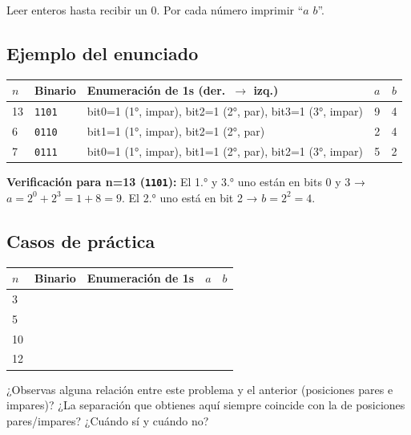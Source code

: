 \documentclass[12pt, oneside]{article}
\begin{document}
Leer enteros hasta recibir un 0.  Por cada número imprimir ``$a$ $b$''.

\subsection{Ejemplo del enunciado}

\begin{center}
\begin{tabular}{p{1.2cm}p{2cm}p{4.8cm}cc}
  \toprule
  $n$ & \textbf{Binario} & \textbf{Enumeración de 1s (der.\ $\to$ izq.)} & $a$ & $b$ \\
  \midrule
  13 & \texttt{1101}
     & bit0=1 (1°, impar), bit2=1 (2°, par), bit3=1 (3°, impar)
     & 9 & 4 \\
   6 & \texttt{0110}
     & bit1=1 (1°, impar), bit2=1 (2°, par)
     & 2 & 4 \\
   7 & \texttt{0111}
     & bit0=1 (1°, impar), bit1=1 (2°, par), bit2=1 (3°, impar)
     & 5 & 2 \\
  \bottomrule
\end{tabular}
\end{center}

\textbf{Verificación para n=13 (\texttt{1101}):}
El 1.° y 3.° uno están en bits 0 y 3 → $a = 2^0 + 2^3 = 1+8 = 9$.
El 2.° uno está en bit 2 → $b = 2^2 = 4$.

\subsection{Casos de práctica}

\begin{center}
\begin{tabular}{p{0.8cm}p{2cm}p{4.5cm}cc}
  \toprule
  $n$ & \textbf{Binario} & \textbf{Enumeración de 1s} & $a$ & $b$ \\
  \midrule
   3  & & & & \\[14pt]
   5  & & & & \\[14pt]
  10  & & & & \\[14pt]
  12  & & & & \\[14pt]
  \bottomrule
\end{tabular}
\end{center}

\vspace{0.5cm}

¿Observas alguna relación entre este problema y el anterior (posiciones pares
e impares)?  ¿La separación que obtienes aquí siempre coincide con la de
posiciones pares/impares?  ¿Cuándo sí y cuándo no?
\end{document}
